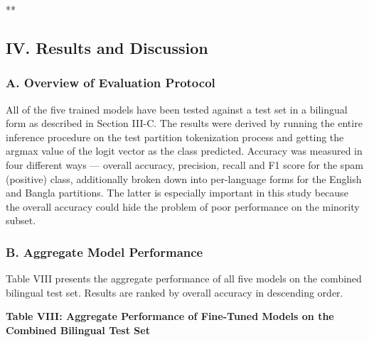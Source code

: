 **

\subsection{IV. Results and
Discussion}\label{iv.-results-and-discussion}

\subsubsection{A. Overview of Evaluation
Protocol}\label{a.-overview-of-evaluation-protocol}

All of the five trained models have been tested against a test set in a
bilingual form as described in Section III-C. The results were derived
by running the entire inference procedure on the test partition
tokenization process and getting the argmax value of the logit vector as
the class predicted. Accuracy was measured in four different ways ---
overall accuracy, precision, recall and F1 score for the spam (positive)
class, additionally broken down into per-language forms for the English
and Bangla partitions. The latter is especially important in this study
because the overall accuracy could hide the problem of poor performance
on the minority subset.

\subsubsection{B. Aggregate Model
Performance}\label{b.-aggregate-model-performance}

Table VIII presents the aggregate performance of all five models on the
combined bilingual test set. Results are ranked by overall accuracy in
descending order.

\textbf{Table VIII: Aggregate Performance of Fine-Tuned Models on the
Combined Bilingual Test Set}

